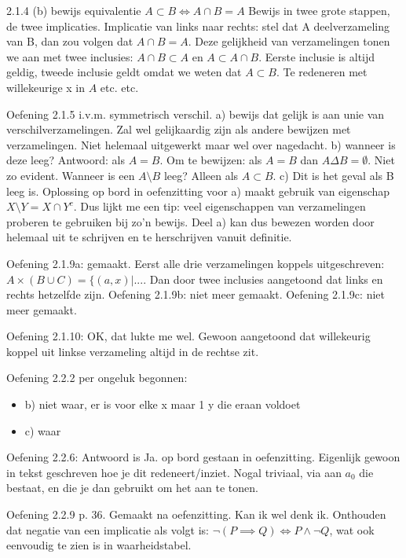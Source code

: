 \documentclass{article}
\begin{document}
2.1.4 (b) bewijs equivalentie 
$ A \subset B \Leftrightarrow A \cap B = A$
Bewijs in twee grote stappen, de twee implicaties. Implicatie van links naar rechts: stel dat A deelverzameling van B, dan zou volgen dat $A \cap B = A$. Deze gelijkheid van verzamelingen tonen we aan met twee inclusies: $A \cap B \subset A$ en $A \subset A \cap B $. 
Eerste inclusie is altijd geldig, tweede inclusie geldt omdat we weten dat $ A \subset B$. Te redeneren met willekeurige x in $A$ etc. etc. 

Oefening 2.1.5 i.v.m. symmetrisch verschil. a) bewijs dat gelijk is aan unie van verschilverzamelingen. Zal wel gelijkaardig zijn als andere bewijzen met verzamelingen. Niet helemaal uitgewerkt maar wel over nagedacht. b) wanneer is deze leeg? Antwoord: als $A=B$. Om te bewijzen: als $A=B$ dan $A \Delta B = \emptyset$. Niet zo evident. Wanneer is een $A \setminus B $ leeg? Alleen als $A \subset B$. 
c) Dit is het geval als B leeg is. 
Oplossing op bord in oefenzitting voor a) maakt gebruik van eigenschap $X \setminus Y = X \cap Y^c$. Dus lijkt me een tip: veel eigenschappen van verzamelingen proberen te gebruiken bij zo'n bewijs. Deel a) kan dus bewezen worden door helemaal uit te schrijven en te herschrijven vanuit definitie. 


Oefening 2.1.9a: gemaakt. Eerst alle drie verzamelingen koppels uitgeschreven: $A \times (B \cup C) = \{ (a,x) | ...$. Dan door twee inclusies aangetoond dat links en rechts hetzelfde zijn. 
Oefening 2.1.9b: niet meer gemaakt. 
Oefening 2.1.9c: niet meer gemaakt. 

Oefening 2.1.10: OK, dat lukte me wel. Gewoon aangetoond dat willekeurig koppel uit linkse verzameling altijd in de rechtse zit. 

Oefening 2.2.2 per ongeluk begonnen:
\begin{itemize}
    \item b) niet waar, er is voor elke x maar 1 y die eraan voldoet
    \item c) waar
\end{itemize}

Oefening 2.2.6: Antwoord is Ja. op bord gestaan in oefenzitting. Eigenlijk gewoon in tekst geschreven hoe je dit redeneert/inziet. Nogal triviaal, via aan $a_0$ die bestaat, en die je dan gebruikt om het aan te tonen. 


Oefening 2.2.9 p. 36. Gemaakt na oefenzitting. Kan ik wel denk ik. Onthouden dat negatie van een implicatie als volgt is: $\neg (P \implies Q) \Leftrightarrow P \land \neg Q$, wat ook eenvoudig te zien is in waarheidstabel. 
\end{document}
